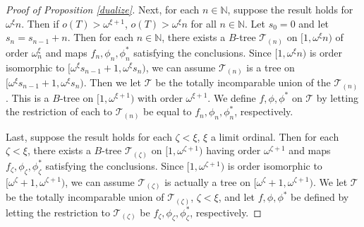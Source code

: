\documentclass[12pt]{amsart}
\theoremstyle{definition}
\newcommand{\nn}{\mathbb{N}}
\newcommand{\ttt}{\mathcal{T}}
\begin{document}
\begin{proof}[Proof of Proposition \ref{dualize}]
Next, for each $n\in \nn$, suppose the result holds for $\omega^\xi n$.  Then if $o(T)>\omega^{\xi+1}$, $o(T)>\omega^\xi n$ for all $n\in \nn$.  Let $s_0=0$ and let $s_n= s_{n-1}+n$.  Then for each $n\in \nn$, there exists a $B$-tree $\ttt_{(n)}$ on $[1, \omega^\xi n)$ of order $\omega^\xi_n$ and maps $f_n, \phi_n, \phi^*_n$ satisfying the conclusions.  Since $[1, \omega^\xi n)$ is order isomorphic to $[\omega^\xi s_{n-1}+1, \omega^\xi s_n)$, we can assume $\ttt_{(n)}$ is a tree on $[\omega^\xi s_{n-1}+1, \omega^\xi s_n)$.  Then we let $\ttt$ be the totally incomparable union of the $\ttt_{(n)}$.  This is a $B$-tree on $[1, \omega^{\xi+1})$ with order $\omega^{\xi+1}$.  We define $f, \phi, \phi^*$ on $\ttt$ by letting the restriction of each to $\ttt_{(n)}$ be equal to $f_n, \phi_n, \phi^*_n$, respectively.  

Last, suppose the result holds for each $\zeta<\xi$, $\xi$ a limit ordinal.  Then for each $\zeta<\xi$, there exists a $B$-tree $\ttt_{(\zeta)}$ on $[1, \omega^{\zeta+1})$ having order $\omega^{\zeta+1}$ and maps $f_\zeta, \phi_\zeta, \phi^*_\zeta$ satisfying the conclusions.  Since $[1, \omega^{\zeta+1})$ is order isomorphic to $[\omega^\zeta+1, \omega^{\zeta+1})$, we can assume $\ttt_{(\zeta)}$ is actually a tree on $[\omega^\zeta +1, \omega^{\zeta+1} )$.  We let $\ttt$ be the totally incomparable union of $\ttt_{(\zeta)}$, $\zeta<\xi$, and let $f, \phi, \phi^*$ be defined by letting the restriction to $\ttt_{(\zeta)}$ be $f_\zeta, \phi_\zeta, \phi^*_\zeta$, respectively.  



\end{proof}
\end{document}
